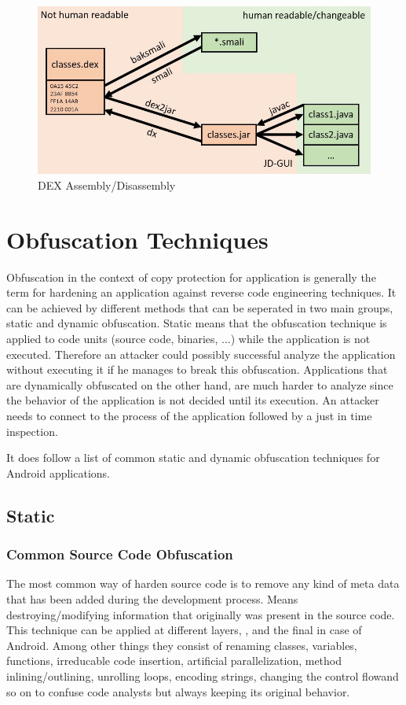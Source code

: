 \begin{figure}[htb]
  \includegraphics[width=\textwidth]{figures/dex_disassembly}
  \caption[DEX Assembly/Disassembly]{DEX Assembly/Disassembly}
  \label{fig:dex_disassembly}
\end{figure}


\section{Obfuscation Techniques}
Obfuscation in the context of copy protection for application
is generally the term for hardening an application against
reverse code engineering techniques. It can be achieved by different methods
that can be seperated in two main groups, static and dynamic obfuscation.
Static means that the obfuscation technique is applied to code units (source
code, binaries, ...) while the application is not executed. Therefore an
attacker could possibly successful analyze the application without executing it
if he manages to break this obfuscation. Applications that are dynamically
obfuscated on the other hand, are much harder to analyze since the behavior
of the application is not decided until its execution. An attacker needs to connect to the process of the application followed by a just in time inspection.

It does follow a list of common static and dynamic obfuscation techniques
for Android applications.

\subsection{Static}
\subsubsection{Common Source Code Obfuscation}
The most common way of harden source code is to remove any kind of meta data
that has been added during the development process. Means destroying/modifying
information that originally was present in the source code.
This technique can be applied at different layers, ,  and the final  in case of Android.
Among other things they consist of renaming
classes, variables, functions, irreducable code insertion,
artificial parallelization, method inlining/outlining, unrolling
loops, encoding strings, changing the control flowand so on to confuse code analysts but always keeping its original behavior.

